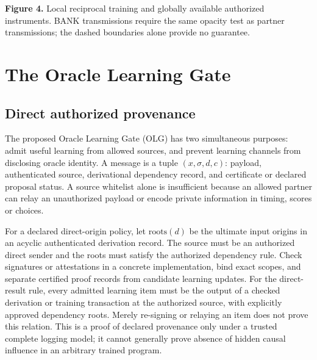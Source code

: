 \documentclass[11pt]{article}
\theoremstyle{definition}\newtheorem{definition}[theorem]{Definition}\newtheorem{conjecture}[theorem]{Conjecture}\newtheorem{example}[theorem]{Example}
\begin{document}
\begin{center}
\end{center}
\textbf{Figure 4.} Local reciprocal training and globally available authorized instruments. BANK transmissions require the same opacity test as partner transmissions; the dashed boundaries alone provide no guarantee.

\section{The Oracle Learning Gate}
\subsection{Direct authorized provenance}
The proposed Oracle Learning Gate (OLG) has two simultaneous purposes: admit useful learning from allowed sources, and prevent learning channels from disclosing oracle identity. A message is a tuple $(x,\sigma,d,c)$: payload, authenticated source, derivational dependency record, and certificate or declared proposal status. A source whitelist alone is insufficient because an allowed partner can relay an unauthorized payload or encode private information in timing, scores or choices.

For a declared direct-origin policy, let $\mathrm{roots}(d)$ be the ultimate input origins in an acyclic authenticated derivation record. The source must be an authorized direct sender and the roots must satisfy the authorized dependency rule. Check signatures or attestations in a concrete implementation, bind exact scopes, and separate certified proof records from candidate learning updates. For the direct-result rule, every admitted learning item must be the output of a checked derivation or training transaction at the authorized source, with explicitly approved dependency roots. Merely re-signing or relaying an item does not prove this relation. This is a proof of declared provenance only under a trusted complete logging model; it cannot generally prove absence of hidden causal influence in an arbitrary trained program.
\end{document}
